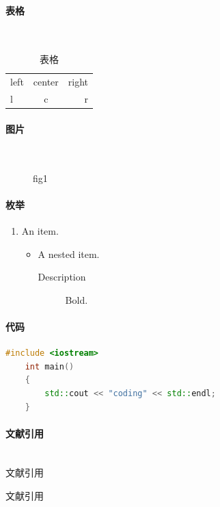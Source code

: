 \documentclass[UTF8, a4paper]{ctexart}
\begin{document}
\paragraph{表格}~{}
\begin{table}[!htbp]
    \caption{表格}
    \centering
    \begin{tabular}{|l|c|r|}    %
        \hline
        left & center & right \\
        l & c & r\\
        \hline
    \end{tabular}
\end{table}

\paragraph{图片}~{}
\begin{figure}[!htbp]
    \centering  %
    \begin{minipage}{10em}
        \centering
        \caption{fig1}    
    \end{minipage}
\end{figure}

\paragraph{枚举}
\begin{enumerate}[(1)]   %
    \item An item.
    \begin{itemize} %
        \item A nested item.
        \begin{description} %
            \item[Description] Bold. 
        \end{description}
    \end{itemize}
\end{enumerate}


\paragraph{代码}
\begin{lstlisting}[language=C++]
    #include <iostream>
    int main()
    {
        std::cout << "coding" << std::endl;
    }
\end{lstlisting}

\paragraph{文献引用}~{}\\
文献引用
\cite{引用}
\begin{thebibliography}{}
     文献引用
\end{thebibliography}

\end{document}
